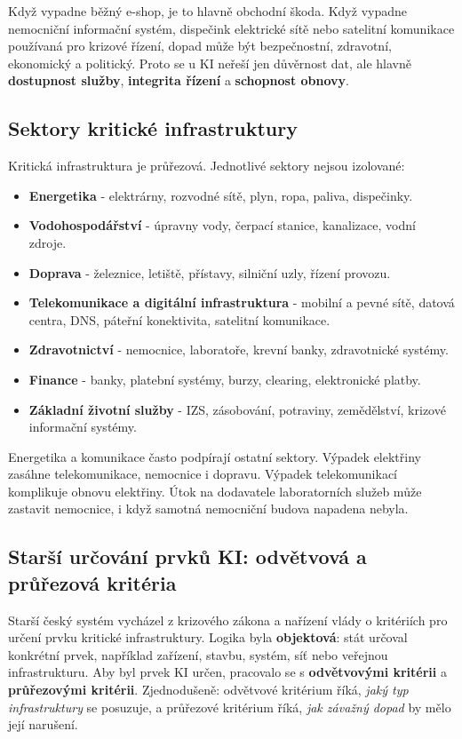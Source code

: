 Když vypadne běžný e-shop, je to hlavně obchodní škoda. Když vypadne nemocniční informační systém, dispečink elektrické sítě nebo satelitní komunikace používaná pro krizové řízení, dopad může být bezpečnostní, zdravotní, ekonomický a politický. Proto se u KI neřeší jen důvěrnost dat, ale hlavně \textbf{dostupnost služby}, \textbf{integrita řízení} a \textbf{schopnost obnovy}.

\subsection*{Sektory kritické infrastruktury}
Kritická infrastruktura je průřezová. Jednotlivé sektory nejsou izolované:
\begin{itemize}
  \item \textbf{Energetika} - elektrárny, rozvodné sítě, plyn, ropa, paliva, dispečinky.
  \item \textbf{Vodohospodářství} - úpravny vody, čerpací stanice, kanalizace, vodní zdroje.
  \item \textbf{Doprava} - železnice, letiště, přístavy, silniční uzly, řízení provozu.
  \item \textbf{Telekomunikace a digitální infrastruktura} - mobilní a pevné sítě, datová centra, DNS, páteřní konektivita, satelitní komunikace.
  \item \textbf{Zdravotnictví} - nemocnice, laboratoře, krevní banky, zdravotnické systémy.
  \item \textbf{Finance} - banky, platební systémy, burzy, clearing, elektronické platby.
  \item \textbf{Základní životní služby} - IZS, zásobování, potraviny, zemědělství, krizové informační systémy.
\end{itemize}
Energetika a komunikace často podpírají ostatní sektory. Výpadek elektřiny zasáhne telekomunikace, nemocnice i dopravu. Výpadek telekomunikací komplikuje obnovu elektřiny. Útok na dodavatele laboratorních služeb může zastavit nemocnice, i když samotná nemocniční budova napadena nebyla.

\subsection*{Starší určování prvků KI: odvětvová a průřezová kritéria}
Starší český systém vycházel z krizového zákona a nařízení vlády o kritériích pro určení prvku kritické infrastruktury. Logika byla \textbf{objektová}: stát určoval konkrétní prvek, například zařízení, stavbu, systém, síť nebo veřejnou infrastrukturu. Aby byl prvek KI určen, pracovalo se s \textbf{odvětvovými kritérii} a \textbf{průřezovými kritérii}. Zjednodušeně: odvětvové kritérium říká, \emph{jaký typ infrastruktury} se posuzuje, a průřezové kritérium říká, \emph{jak závažný dopad} by mělo její narušení.

